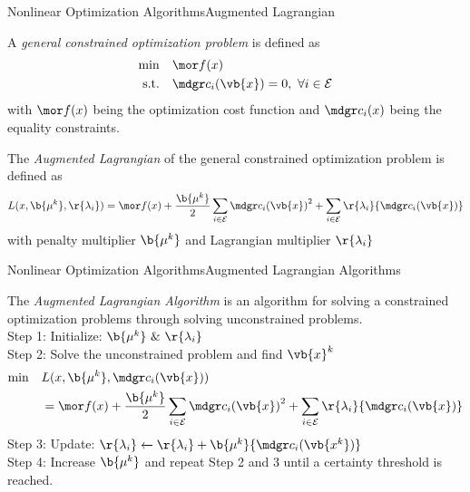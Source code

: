 \begin{frame}{Nonlinear Optimization Algorithms}{Augmented Lagrangian \cite{vandenberghe2012convex}\cite{burer2003nonlinear}}
    \begin{definitionN}
        A \emph{general constrained optimization problem} is defined as
        \begin{align}
            \min \quad& {\mor f(x)}\\
            \text{s.t.} \quad& {\mdgr c_i(\vb{x})} = 0, \ \forall i \in \mathcal{E}
        \end{align}
        with ${\mor f(x)}$ being the optimization cost function and ${\mdgr c_i(x)}$ being the equality constraints.
    \end{definitionN}
    \begin{definitionN}
        The \emph{Augmented Lagrangian} of the general constrained optimization problem is defined as
        \begin{align}
            L(x, \b{\mu^k}, \r{ \lambda_i}) = {\mor f(x)} + \frac{ \b{\mu^k}}{2} \sum_{i \in \mathcal{E}} {\mdgr c_i(\vb{x})}^2 + \sum_{i\in \mathcal{E}} \r{\lambda_i} {\mdgr c_i(\vb{x})}
        \end{align}
        with penalty multiplier $\b{\mu^k}$ and Lagrangian multiplier $\r{\lambda_i}$
    \end{definitionN}
\end{frame}{}

\begin{frame}{Nonlinear Optimization Algorithms}{Augmented Lagrangian Algorithms\cite{vandenberghe2012convex}\cite{burer2003nonlinear}}
    \begin{definitionN}
        The \emph{Augmented Lagrangian Algorithm} is an algorithm for solving a constrained optimization problems through solving unconstrained problems.\\
        Step 1: Initialize: $\b{\mu^k} \ \& \ \r{\lambda_i}$\\
        Step 2: Solve the unconstrained problem and find $\vb{x}^k$
            \begin{align}
                \min \quad & L(x, \b{\mu^k}, {\mdgr c_i(\vb{x})})\nonumber\\
                &={\mor f(x)} + \frac{\b{ \mu^k}}{2} \sum_{i \in \mathcal{E}} {\mdgr c_i(\vb{x})}^2 + \sum_{i\in \mathcal{E}} \r{\lambda_i} {\mdgr c_i(\vb{x})}
            \end{align}
        Step 3: Update: $\r{\lambda_i}  \xleftarrow{} \r{\lambda_i} + \b{\mu^k} {\mdgr c_i(\vb{x^k})}$\\
        Step 4: Increase $\b{\mu^k}$ and repeat Step 2 and 3 until a certainty threshold is reached.
    \end{definitionN}
\end{frame}{}

